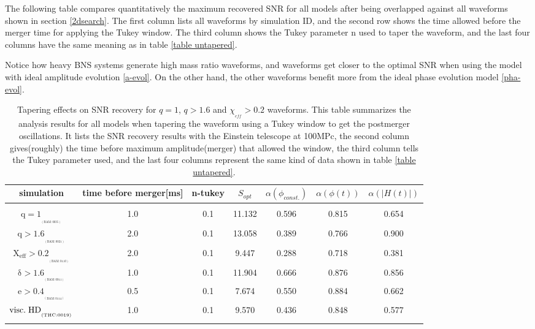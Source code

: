 The following table compares quantitatively the maximum recovered SNR for all models after being overlapped against all waveforms shown in section \ref{2dsearch}. The first column lists all waveforms by simulation ID, and the second row shows the time allowed before the merger time for applying the Tukey window. The third column shows the Tukey parameter n used to taper the waveform, and the last four columns have the same meaning as in table \ref{table untapered}.


Notice how heavy BNS systems generate high mass ratio waveforms, and waveforms get closer to the optimal SNR when using the model with ideal amplitude evolution \ref{a-evol}. On the other hand, the other waveforms benefit more from the ideal phase evolution model \ref{pha-evol}.

\begin{table}[!htbp]
\begin{center}

\begin{tabular}{ccccccc}
simulation&time before merger[ms]&n-tukey&$S_{opt}$&$\alpha(\phi_{const.})$&$\alpha(\phi(t))$&$\alpha(|H(t)|)$\\ 
\hline\\ 
$\mathrm{{q=1}_{_{_{(BAM:0035)}}}}$&1.0&0.1&11.132&0.596&0.815&0.654\\  
$\mathrm{{q>1.6}_{_{_{(BAM:0021)}}}}$&2.0&0.1&13.058&0.389&0.766&0.900\\  
$\mathrm{{X_{eff}>0.2}_{_{_{(BAM:0110)}}}}$&2.0&0.1&9.447&0.288&0.718&0.381\\  
$\mathrm{{\delta>1.6}_{_{_{(BAM:0011)}}}}$&1.0&0.1&11.904&0.666&0.876&0.856\\  
$\mathrm{{e>0.4}_{_{_{(BAM:0114)}}}}$&0.5&0.1&7.674&0.550&0.884&0.662\\  
$\mathrm{{visc.\hspace{1mm} HD}_{_{_{(THC:0019)}}}}$&1.0&0.1&9.570&0.436&0.848&0.577\\  
\hline\\ 
\end{tabular}
\captionsetup{width=0.8\textwidth}
\caption[Tapering effects on SNR recovery for $q=1$, $q>1.6$ and $\chi_{_{eff}}>0.2$ waveforms]{Tapering effects on SNR recovery for $q=1$, $q>1.6$ and $\chi_{_{eff}}>0.2$ waveforms. This table summarizes the analysis results for all models when tapering the waveform using a Tukey window to get the postmerger oscillations. It lists the  SNR  recovery results with the Einstein telescope at 100MPc, the second column gives(roughly) the time before maximum amplitude(merger) that allowed the window,  the third column tells the Tukey parameter used, and the last four columns represent the same kind of data shown in table \ref{table untapered}.}
\end{center}
\end{table}
\FloatBarrier






